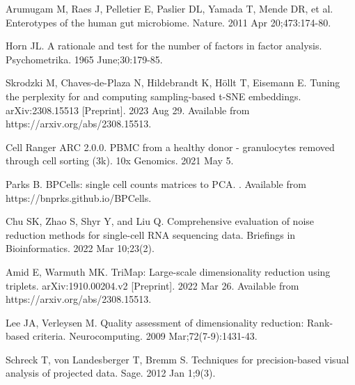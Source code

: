 \documentclass{article}
\begin{document}
\begin{thebibliography}{10}
Arumugam M, Raes J, Pelletier E, Paslier DL, Yamada T, Mende DR, et al.
\newblock Enterotypes of the human gut microbiome.
\newblock Nature. 2011 Apr 20;473:174-80.

Horn JL.
\newblock A rationale and test for the number of factors in factor analysis.
\newblock Psychometrika. 1965 June;30:179-85.

Skrodzki M, Chaves-de-Plaza N, Hildebrandt K, H\"ollt T, Eisemann E.
\newblock Tuning the perplexity for and computing sampling-based t-SNE embeddings.
\newblock arXiv:2308.15513 [Preprint]. 2023 Aug 29. Available from https://arxiv.org/abs/2308.15513.

Cell Ranger ARC 2.0.0.
\newblock PBMC from a healthy donor - granulocytes removed through cell sorting (3k).
\newblock 10x Genomics. 2021 May 5.

Parks B.
\newblock BPCells: single cell counts matrices to PCA.
. Available from https://bnprks.github.io/BPCells.

Chu SK, Zhao S, Shyr Y, and Liu Q.
\newblock Comprehensive evaluation of noise reduction methods for single-cell RNA sequencing data.
\newblock Briefings in Bioinformatics. 2022 Mar 10;23(2).

Amid E, Warmuth MK. 
\newblock TriMap: Large-scale dimensionality reduction using triplets. 
\newblock arXiv:1910.00204.v2 [Preprint]. 2022 Mar 26. Available from https://arxiv.org/abs/2308.15513.

Lee JA, Verleysen M.
\newblock Quality assessment of dimensionality reduction: Rank-based criteria.
\newblock Neurocomputing. 2009 Mar;72(7-9):1431-43.

Schreck T, von Landesberger T, Bremm S.
\newblock Techniques for precision-based visual analysis of projected data.
\newblock Sage. 2012 Jan 1;9(3).

\end{thebibliography}
\end{document}
